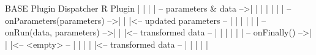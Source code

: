 BASE                      Plugin Dispatcher                          R Plugin
 |                               |                                       |
 | --       parameters & data -->|                                       |
 |                               |                                       |
 |                               | --        onParameters(parameters) -->|
 |                               |<-- updated parameters              -- |
 |                               |                                       |
 |                               | --         onRun(data, parameters) -->|
 |                               |<-- transformed data                -- |
 |                               |                                       |
 |                               | --                     onFinally() -->|
 |                               |<-- <empty>                         -- |
 |                               |                                       |
 |<-- transformed data        -- |                                       |
 |                               |                                       |


\begin{center}
\resizebox{\linewidth}{!}{
 \begin{psmatrix}[colsep=0.2,rowsep=0.5]
 \end{psmatrix}
}
\end{center}
